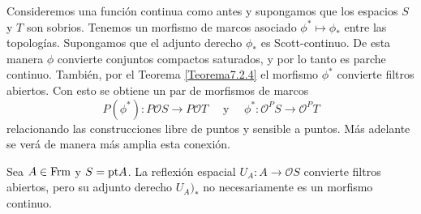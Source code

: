 Consideremos una función continua como antes y supongamos que los espacios $S$ y $T$ son sobrios. Tenemos un morfismo de marcos asociado $\phi^*\mapsto \phi_*$ entre las topologías. Supongamos que el adjunto derecho $\phi_*$ es Scott-continuo. De esta manera $\phi$ convierte conjuntos compactos saturados, y por lo tanto es parche continuo. También, por el Teorema \ref{Teorema7.2.4} el morfismo $\phi^*$ convierte filtros abiertos. Con esto se obtiene un par de morfismos de marcos 
\[
P(\phi^*)\colon P\mathcal{O}S\to P\mathcal{O}T\quad \mbox{ y } \quad \phi^*\colon \mathcal{O}^PS\to \mathcal{O}^PT
\]
relacionando las construcciones libre de puntos y sensible a puntos. Más adelante se verá de manera más amplia esta conexión.

\begin{thm}\label{Teorema7.2.5}
    Sea $A\in \mathrm{Frm}$ y $S=\mathrm{pt} A$. La reflexión espacial $U_A\colon A\to \mathcal{O}S$ convierte filtros abiertos, pero su adjunto derecho $U_A)_*$ no necesariamente es un morfismo continuo.
\end{thm}

